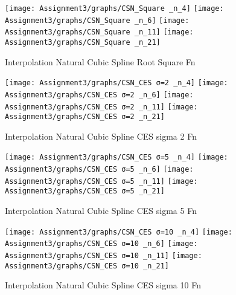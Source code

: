 \documentclass[]{article}
\begin{document}
\begin{figure}

{\centering \texttt{[image: Assignment3/graphs/CSN\_Square \_n\_4]} \texttt{[image: Assignment3/graphs/CSN\_Square \_n\_6]} \texttt{[image: Assignment3/graphs/CSN\_Square \_n\_11]} \texttt{[image: Assignment3/graphs/CSN\_Square \_n\_21]} 

}

\caption{Interpolation Natural Cubic Spline Root Square Fn}\label{fig:unnamed-chunk-13}
\end{figure}

\begin{figure}

{\centering \texttt{[image: Assignment3/graphs/CSN\_CES σ=2 \_n\_4]} \texttt{[image: Assignment3/graphs/CSN\_CES σ=2 \_n\_6]} \texttt{[image: Assignment3/graphs/CSN\_CES σ=2 \_n\_11]} \texttt{[image: Assignment3/graphs/CSN\_CES σ=2 \_n\_21]} 

}

\caption{Interpolation Natural Cubic Spline CES sigma 2 Fn}\label{fig:unnamed-chunk-14}
\end{figure}

\begin{figure}

{\centering \texttt{[image: Assignment3/graphs/CSN\_CES σ=5 \_n\_4]} \texttt{[image: Assignment3/graphs/CSN\_CES σ=5 \_n\_6]} \texttt{[image: Assignment3/graphs/CSN\_CES σ=5 \_n\_11]} \texttt{[image: Assignment3/graphs/CSN\_CES σ=5 \_n\_21]} 

}

\caption{Interpolation Natural Cubic Spline CES sigma 5 Fn}\label{fig:unnamed-chunk-15}
\end{figure}

\begin{figure}

{\centering \texttt{[image: Assignment3/graphs/CSN\_CES σ=10 \_n\_4]} \texttt{[image: Assignment3/graphs/CSN\_CES σ=10 \_n\_6]} \texttt{[image: Assignment3/graphs/CSN\_CES σ=10 \_n\_11]} \texttt{[image: Assignment3/graphs/CSN\_CES σ=10 \_n\_21]} 

}

\caption{Interpolation Natural Cubic Spline CES sigma 10 Fn}\label{fig:unnamed-chunk-16}
\end{figure}
\end{document}
